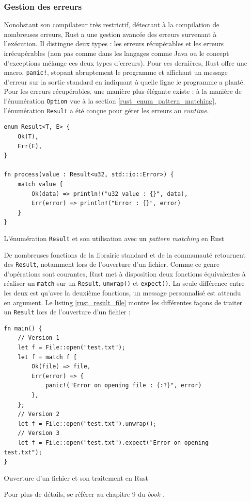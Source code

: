 \documentclass[a4paper, 12pt]{article}
\newenvironment{code}{\captionsetup{type=listing}}{}
\begin{document}
\subsubsection{Gestion des erreurs} 
Nonobstant son compilateur très restrictif, détectant à la compilation de nombreuses erreurs, Rust 
a une gestion avancée des erreurs survenant à l'exécution. Il distingue deux types : les erreurs 
récupérables et les erreurs irrécupérables (non pas comme dans les langages comme Java ou le concept 
d'exceptions mélange ces deux types d'erreurs). Pour ces dernières, Rust offre une macro, 
\texttt{panic!}, stopant abruptement le programme et affichant un message d'erreur sur 
la sortie standard en indiquant à quelle ligne le programme a planté. Pour les erreurs récupérables, 
une manière plus élégante existe : à la manière de l'énumération \texttt{Option} vue à 
la section \ref{rust_enum_pattern_matching}, l'énumération \texttt{Result} a été conçue 
pour gérer les erreurs au \textit{runtime}.
\bigbreak
\begin{code}
    \begin{verbatim}
enum Result<T, E> {
    Ok(T),
    Err(E),
}

fn process(value : Result<u32, std::io::Error>) {
    match value {
        Ok(data) => println!("u32 value : {}", data),
        Err(error) => println!("Error : {}", error)
    }
}
    \end{verbatim}
    \caption{L'énumération \texttt{Result} et son utilisation avec un \textit{pattern matching} en Rust}
    \label{rust_result}
\end{code}
\bigbreak
De nombreuses fonctions de la librairie standard et de la communauté retournent des 
\texttt{Result}, notamment lors de l'ouverture d'un fichier. Comme ce genre d'opérations 
sont courantes, Rust met à disposition deux fonctions équivalentes à réaliser un \texttt{match} 
sur un \texttt{Result}, \texttt{unwrap()} et \texttt{expect()}. La 
seule différence entre les deux est qu'avec la deuxième fonctions, un message personnalisé est 
attendu en argument. Le listing \ref{rust_result_file} montre les différentes façons de traiter un 
\texttt{Result} lors de l'ouverture d'un fichier :
\bigbreak
\begin{code}
    \begin{verbatim}
fn main() {
    // Version 1
    let f = File::open("test.txt");
    let f = match f {
        Ok(file) => file,
        Err(error) => {
            panic!("Error on opening file : {:?}", error)
        },
    };
    // Version 2
    let f = File::open("test.txt").unwrap();
    // Version 3
    let f = File::open("test.txt").expect("Error on opening test.txt");
}
    \end{verbatim}
    \caption{Ouverture d'un fichier et son traitement en Rust}
    \label{rust_result_file}
\end{code}
\bigbreak
Pour plus de détails, se référer au chapitre 9 du \textit{book} \cite{ref0}.
\end{document}
